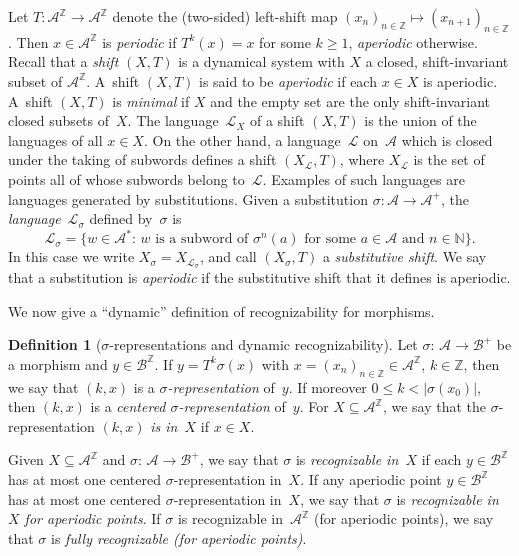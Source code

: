 \documentclass{amsart}
\theoremstyle{definition}
\newtheorem{definition}[lemma]{Definition}
\theoremstyle{remark}
\numberwithin{equation}{section}
\begin{document}
Let $T: \mathcal{A}^\mathbb{Z}\rightarrow \mathcal{A}^\mathbb{Z}$ denote the (two-sided) left-shift map $(x_n)_{n\in\mathbb{Z}} \mapsto (x_{n+1})_{n\in\mathbb{Z}}$. 
Then $x \in \mathcal{A}^\mathbb{Z}$ is \emph{periodic} if $T^k(x) = x$ for some $k \ge 1$, \emph{aperiodic} otherwise.
Recall that a \emph{shift} $(X,T)$ is a dynamical system with $X$ a closed, shift-invariant subset of $\mathcal{A}^\mathbb{Z}$.
A~shift $(X,T)$ is said to be \emph{aperiodic} if each $x \in X$ is aperiodic.
A~shift $(X,T)$ is \emph{minimal} if $X$ and the empty set are the only shift-invariant closed subsets of~$X$. 
The language~$\mathcal{L}_X$ of a shift $(X,T)$ is the union of the languages of all $x \in X$. 
On the other hand, a language~$\mathcal{L}$ on~$\mathcal{A}$ which is closed under the taking of subwords defines a shift $(X_\mathcal{L}, T)$, where $X_\mathcal{L}$ is the set of points all of whose subwords belong to~$\mathcal{L}$. 
Examples of such languages are languages generated by substitutions.
Given a substitution $\sigma:\mathcal{A} \rightarrow \mathcal{A}^+$, the \emph{language}~$\mathcal{L}_{\sigma}$ defined by~$\sigma$ is
\[
\mathcal{L}_{\sigma} = \big\{w \in \mathcal{A}^*:\, \mbox{$w$ is a subword of $\sigma^n(a)$ for some  $a\in\mathcal{A}$ and $n\in \mathbb N$}\big\}.
\]
In this case we  write $X_\sigma = X_{\mathcal{L}_\sigma}$, and call $(X_\sigma, T)$ a \emph{substitutive shift}. We say that a substitution is \emph{aperiodic} if the substitutive shift that it defines is aperiodic.

We now give a ``dynamic'' definition of recognizability for morphisms.

\begin{definition}[$\sigma$-representations and  dynamic recognizability] \label{def:recog}
Let $\sigma:\, \mathcal{A} \to \mathcal{B}^+$ be a morphism and $y \in \mathcal{B}^\mathbb{Z}$.
If $y = T^k \sigma(x)$ with $x=(x_n)_{n\in \mathbb Z}
\in \mathcal{A}^\mathbb{Z}$, $k \in \mathbb{Z}$, then we say that $(k,x)$ is a \emph{$\sigma$-representation} of~$y$. 
If moreover $0 \leq k < |\sigma(x_0)|$, then $(k,x)$ is a \emph{centered $\sigma$-representation} of~$y$. 
For $X \subseteq \mathcal{A}^\mathbb{Z}$, we say that the $\sigma$-representation $(k,x)$ \emph{is in~$X$} if $x \in X$.

Given $X \subseteq \mathcal{A}^\mathbb{Z}$ and $\sigma:\, \mathcal{A} \to \mathcal{B}^+$, we say that $\sigma$ is \emph{recognizable in~$X$} if each $y \in \mathcal{B}^\mathbb{Z}$ has at most one centered $\sigma$-representation in~$X$. 
If any aperiodic point $y \in \mathcal{B}^\mathbb{Z}$ has at most one centered $\sigma$-representation in~$X$, we say that $\sigma$ is \emph{recognizable in~$X$ for aperiodic points}. 
If $\sigma$ is recognizable in~$\mathcal{A}^\mathbb{Z}$ (for aperiodic points), we say that $\sigma$ is \emph{fully recognizable (for aperiodic points)}.
\end{definition}
\end{document}
